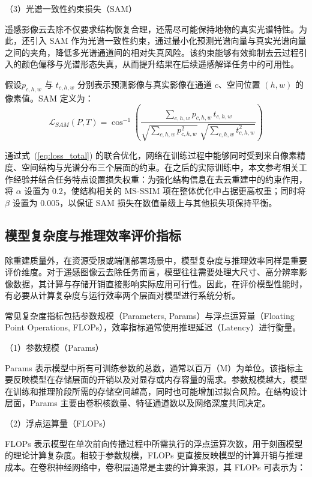 （3）光谱一致性约束损失（SAM）

遥感影像云去除不仅要求结构恢复合理，还需尽可能保持地物的真实光谱特性。为此，还引入 SAM 作为光谱一致性约束，通过最小化预测光谱向量与真实光谱向量之间的夹角，降低多光谱通道间的相对失真风险。该约束能够有效抑制去云过程引入的颜色偏移与光谱形态失真，从而提升结果在后续遥感解译任务中的可用性。

假设$p_{c,h,w}$ 与 $t_{c,h,w}$ 分别表示预测影像与真实影像在通道 $c$、空间位置 $(h,w)$ 的像素值。SAM 定义为：
\begin{equation}
\mathcal{L}_{SAM}(P, T)
= \cos^{-1} \left(
\frac{\sum\limits_{c,h,w} p_{c,h,w}\, t_{c,h,w}}
{\sqrt{\sum\limits_{c,h,w} p_{c,h,w}^2}\;
 \sqrt{\sum\limits_{c,h,w} t_{c,h,w}^2}}
\right)
\label{eq:loss_sam}
\end{equation}

通过式~(\ref{eq:loss_total}) 的联合优化，网络在训练过程中能够同时受到来自像素精度、空间结构与光谱分布三个层面的约束。在之后的实际训练中，本文参考相关工作经验并结合任务特点设置损失权重：为强化结构信息在去云重建中的约束作用，将 $\alpha$ 设置为 0.2，使结构相关的 MS-SSIM 项在整体优化中占据更高权重；同时将 $\beta$ 设置为 0.005，以保证 SAM 损失在数值量级上与其他损失项保持平衡。

\subsection{模型复杂度与推理效率评价指标}

除重建质量外，在资源受限或端侧部署场景中，模型复杂度与推理效率同样是重要评价维度。对于遥感图像云去除任务而言，模型往往需要处理大尺寸、高分辨率影像数据，其计算与存储开销直接影响实际应用可行性。因此，在评价模型性能时，有必要从计算复杂度与运行效率两个层面对模型进行系统分析。

常见复杂度指标包括参数规模（Parameters, Params）与浮点运算量（Floating Point Operations, FLOPs），效率指标通常使用推理延迟（Latency）进行衡量。

（1）参数规模（Params）

Params 表示模型中所有可训练参数的总数，通常以百万（M）为单位。该指标主要反映模型在存储层面的开销以及对显存或内存容量的需求。参数规模越大，模型在训练和推理阶段所需的存储空间越高，同时也可能增加过拟合风险。在结构设计层面，Params 主要由卷积核数量、特征通道数以及网络深度共同决定。

（2）浮点运算量（FLOPs）

FLOPs 表示模型在单次前向传播过程中所需执行的浮点运算次数，用于刻画模型的理论计算复杂度。相较于参数规模，FLOPs 更直接反映模型的计算开销与推理成本。在卷积神经网络中，卷积层通常是主要的计算来源，其 FLOPs 可表示为：

